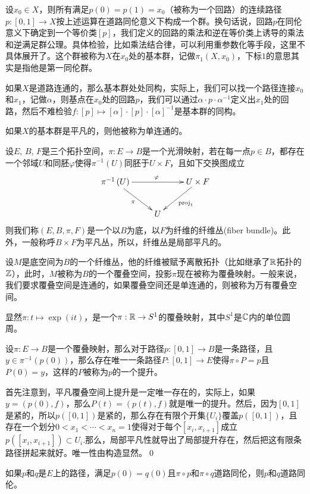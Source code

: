 \para 设$x_0\in X$，则所有满足$p(0)=p(1)=x_0$（被称为一个{\kaishu 回路}）的连续路径$p:[0,1]\to X$按上述运算在道路同伦意义下构成一个群。换句话说，回路$p$在同伦意义下确定到一个等价类$[p]$，我们定义的回路的乘法和逆在等价类上诱导的乘法和逆满足群公理。具体检验，比如乘法结合律，可以利用重参数化等手段，这里不具体展开了。这个群被称为$X$在$x_0$处的{\kaishu 基本群}，记做$\pi_1(X,x_0)$，下标$1$的意思其实是指他是第一同伦群。

如果$X$是道路连通的，那么基本群处处同构，实际上，我们可以找一个路径连接$x_0$和$x_1$，记做$\alpha$，则基点在$x_0$处的回路$p$，我们可以通过$\alpha \cdot p \cdot \alpha^{-1}$定义出$x_1$处的回路，然后不难检验$f:[p]\mapsto [\alpha] \cdot [p] \cdot [\alpha]^{-1}$是基本群的同构。

如果$X$的基本群是平凡的，则他被称为{\kaishu 单连通}的。

\textbf{} 设$E$, $B$, $F$是三个拓扑空间，$\pi:E\to B$是一个光滑映射，若在每一点$p\in B$，都存在一个邻域$U$和同胚$\varphi$使得$\pi^{-1}(U)$同胚于$U \times F$，且如下交换图成立
\[
	\xymatrix{
		\pi^{-1}\left(U\right)\ar[rr]^\varphi \ar[dr]_\pi&&U\times F \ar[dl]^{\mathrm{proj}_1}\\
		&U&
		}
\]
则我们称$(E, B, \pi, F)$是一个以$B$为底，以$F$为纤维的{\kaishu 纤维丛}(fiber bundle)。此外，一般称呼$B\times F$为平凡丛，所以，纤维丛是局部平凡的。

\textbf{} 设$M$是底空间为$B$的一个纤维丛，他的纤维被赋予离散拓扑（比如继承了$\mathbb{R}$拓扑的$\mathbb{Z}$），此时，$M$被称为$B$的一个覆叠空间，投影$\pi$现在被称为覆叠映射。一般来说，我们要求覆叠空间是连通的，如果覆叠空间还是单连通的，则被称为万有覆叠空间。

显然$\pi:t\mapsto \exp(it)$，是一个$\pi:\mathbb{R} \to S^1$的覆叠映射，其中$S^1$是$\mathbb{C}$内的单位圆周。

\lem 设$\pi:E\to B$是一个覆叠映射，那么对于路径$p:[0,1]\to B$是一条路径，且$y\in \pi^{-1}(p(0))$，那么存在唯一一条路径$P:[0,1]\to E$使得$\pi\circ P=p$且$P(0)=y$，这样的$P$被称为$p$的一个提升。

\proof 首先注意到，平凡覆叠空间上提升是一定唯一存在的，实际上，如果$y=(p(0),f)$，那么$P(t)=(p(t),f)$就是唯一的提升。然后，因为$[0,1]$是紧的，所以$p([0,1])$是紧的，那么存在有限个开集$\{U_i\}$覆盖$p([0,1])$，且存在一个划分$0<x_1<\cdots<x_n=1$使得对于每个$[x_i,x_{i+1}]$成立$p([x_i,x_{i+1}])\subset U_i$.那么，局部平凡性就导出了局部提升存在，然后把这有限条路径拼起来就好。唯一性由构造显然。\qed

\para 如果$p$和$q$是$E$上的路径，满足$p(0)=q(0)$且$\pi\circ p$和$\pi\circ q$道路同伦，则$p$和$q$道路同伦。

